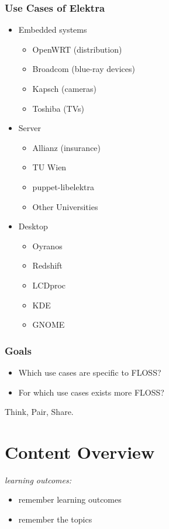 \begin{frame}
	\frametitle{Use Cases of Elektra}
	\begin{itemize}[<+->]
	\item Embedded systems
	\begin{itemize}
	\item OpenWRT (distribution)
	\item Broadcom (blue-ray devices)
	\item Kapsch (cameras)
	\item Toshiba (TVs)
	\end{itemize}
	\item Server
	\begin{itemize}
	\item Allianz (insurance)
	\item TU Wien
	\item puppet-libelektra
	\item Other Universities
	\end{itemize}
	\item Desktop
	\begin{itemize}
	\item Oyranos
	\item Redshift
	\item LCDproc
	\item KDE
	\item GNOME
	\end{itemize}
	\end{itemize}
\end{frame}

\begin{assignment}
	\frametitle{Goals}
	\begin{itemize}
		\item Which use cases are specific to FLOSS?
		\item For which use cases exists more FLOSS?
	\end{itemize}

	\begin{task}
	Think, Pair, Share.
	\end{task}
\end{assignment}

\section{Content Overview}

\begin{frame}
	\textit{learning outcomes:}
	\begin{itemize}
		\item remember learning outcomes
		\item remember the topics
	\end{itemize}
\end{frame}

